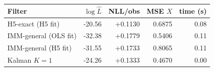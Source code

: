 \begin{tabular}{lrrrr}
\toprule
Filter & $\log\hat L$ & NLL/obs & MSE $X$ & time (s) \\
\midrule
H5-exact (H5 fit) & -20.56 & +0.1130 & 0.6875 & 0.08 \\
IMM-general (OLS fit) & -32.38 & +0.1779 & 0.5406 & 0.11 \\
IMM-general (H5 fit) & -31.55 & +0.1733 & 0.8065 & 0.11 \\
Kalman $K=1$ & -24.26 & +0.1333 & 0.4670 & 0.00 \\
\bottomrule
\end{tabular}
